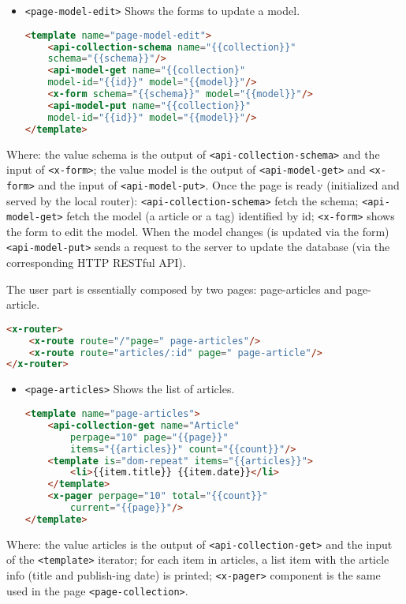 \begin{itemize} \item \texttt{<page-model-edit>} Shows the forms to update a model.
\begin{lstlisting}[language=html]
<template name="page-model-edit">
	<api-collection-schema name="{{collection}}"
	schema="{{schema}}"/>
	<api-model-get name="{{collection}"
	model-id="{{id}}" model="{{model}}"/>
	<x-form schema="{{schema}}" model="{{model}}"/>
	<api-model-put name="{{collection}}"
	model-id="{{id}}" model="{{model}}"/>
</template>
\end{lstlisting}
\end{itemize}

Where: the value schema is the output of \texttt{<api-collection-schema>} and the input of \texttt{<x-form>}; the value model is the output of \texttt{<api-model-get>} and \texttt{<x-form>} and the input of \texttt{<api-model-put>}. Once the page is ready (initialized and served by the local router): \texttt{<api-collection-schema>} fetch the schema; \texttt{<api-model-get>} fetch the model (a article or a tag) identified by id; \texttt{<x-form>} shows the form to edit the model. When the model changes (is updated via the form) \texttt{<api-model-put>} sends a request to the server to update the database (via the corresponding HTTP RESTful API).


The user part is essentially composed by two pages: page-articles and page-article.

\begin{lstlisting}[language=html]
<x-router>
	<x-route route="/"page=" page-articles"/>
	<x-route route="articles/:id" page=" page-article"/>
</x-router>
\end{lstlisting}

\begin{itemize} \item \texttt{<page-articles>} Shows the list of articles.
\begin{lstlisting}[language=html]
<template name="page-articles">
	<api-collection-get name="Article"
		perpage="10" page="{{page}}"
		items="{{articles}}" count="{{count}}"/>
	<template is="dom-repeat" items="{{articles}}">
		<li>{{item.title}} {{item.date}}</li>
	</template>
	<x-pager perpage="10" total="{{count}}"
		current="{{page}}"/>
</template>
\end{lstlisting}
\end{itemize}

Where: the value articles is the output of \texttt{<api-collection-get>} and the input of the \texttt{<template>} iterator; for each item in articles, a list item with the article info (title and publish-ing date) is printed; \texttt{<x-pager>} component is the same used in the page \texttt{<page-collection>}.

